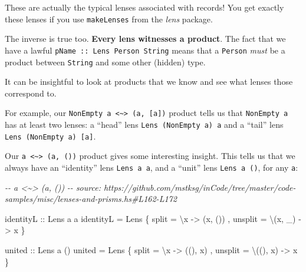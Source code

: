 \documentclass[]{article}
\newenvironment{Shaded}{}{}
\newcommand{\CommentTok}[1]{\textcolor[rgb]{0.38,0.63,0.69}{\textit{#1}}}
\newcommand{\DataTypeTok}[1]{\textcolor[rgb]{0.56,0.13,0.00}{#1}}
\newcommand{\NormalTok}[1]{#1}
\newcommand{\OtherTok}[1]{\textcolor[rgb]{0.00,0.44,0.13}{#1}}
\begin{document}
These are actually the typical lenses associated with records! You get exactly
these lenses if you use \texttt{makeLenses} from the \emph{lens} package.

The inverse is true too. \textbf{Every lens witnesses a product}. The fact that
we have a lawful \texttt{pName\ ::\ Lens\textquotesingle{}\ Person\ String}
means that a \texttt{Person} \emph{must} be a product between \texttt{String}
and some other (hidden) type.

It can be insightful to look at products that we know and see what lenses those
correspond to.

For example, our
\texttt{NonEmpty\ a\ \textless{}\textasciitilde{}\textgreater{}\ (a,\ {[}a{]})}
product tells us that \texttt{NonEmpty\ a} has at least two lenses: a ``head''
lens \texttt{Lens\textquotesingle{}\ (NonEmpty\ a)\ a} and a ``tail'' lens
\texttt{Lens\textquotesingle{}\ (NonEmpty\ a)\ {[}a{]}}.

Our \texttt{a\ \textless{}\textasciitilde{}\textgreater{}\ (a,\ ())} product
gives some interesting insight. This tells us that we always have an
``identity'' lens \texttt{Lens\textquotesingle{}\ a\ a}, and a ``unit'' lens
\texttt{Lens\textquotesingle{}\ a\ ()}, for any \texttt{a}:

\begin{Shaded}
\begin{Highlighting}[]
\CommentTok{{-}{-} a <\textasciitilde{}> (a, ())}
\CommentTok{{-}{-} source: https://github.com/mstksg/inCode/tree/master/code{-}samples/misc/lenses{-}and{-}prisms.hs\#L162{-}L172}

\OtherTok{identityL ::} \DataTypeTok{Lens\textquotesingle{}}\NormalTok{ a a}
\NormalTok{identityL }\OtherTok{=} \DataTypeTok{Lens\textquotesingle{}}
\NormalTok{    \{ split   }\OtherTok{=}\NormalTok{ \textbackslash{}x      }\OtherTok{{-}>}\NormalTok{ (x, ())}
\NormalTok{    , unsplit }\OtherTok{=}\NormalTok{ \textbackslash{}(x, \_) }\OtherTok{{-}>}\NormalTok{ x}
\NormalTok{    \}}

\OtherTok{united ::} \DataTypeTok{Lens\textquotesingle{}}\NormalTok{ a ()}
\NormalTok{united }\OtherTok{=} \DataTypeTok{Lens\textquotesingle{}}
\NormalTok{    \{ split   }\OtherTok{=}\NormalTok{ \textbackslash{}x       }\OtherTok{{-}>}\NormalTok{ ((), x)}
\NormalTok{    , unsplit }\OtherTok{=}\NormalTok{ \textbackslash{}((), x) }\OtherTok{{-}>}\NormalTok{ x}
\NormalTok{    \}}
\end{Highlighting}
\end{Shaded}
\end{document}
